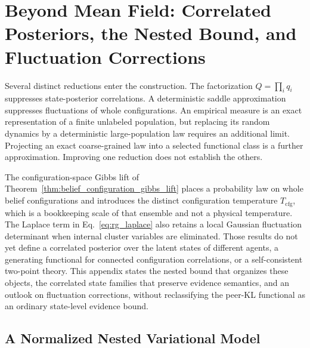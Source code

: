 \section{Beyond Mean Field: Correlated Posteriors, the Nested Bound, and Fluctuation Corrections}
\label{sec:beyond_mean_field_gauge_vfe}

Several distinct reductions enter the construction. The factorization $Q=\prod_i q_i$ suppresses state-posterior correlations. A deterministic saddle approximation suppresses fluctuations of whole configurations. An empirical measure is an exact representation of a finite unlabeled population, but replacing its random dynamics by a deterministic large-population law requires an additional limit. Projecting an exact coarse-grained law into a selected functional class is a further approximation. Improving one reduction does not establish the others.

The configuration-space Gibbs lift of Theorem~\ref{thm:belief_configuration_gibbs_lift} places a probability law on whole belief configurations and introduces the distinct configuration temperature $T_{\mathrm{cfg}}$, which is a bookkeeping scale of that ensemble and not a physical temperature. The Laplace term in Eq.~\eqref{eq:rg_laplace} also retains a local Gaussian fluctuation determinant when internal cluster variables are eliminated. Those results do not yet define a correlated posterior over the latent states of different agents, a generating functional for connected configuration correlations, or a self-consistent two-point theory. This appendix states the nested bound that organizes these objects, the correlated state families that preserve evidence semantics, and an outlook on fluctuation corrections, without reclassifying the peer-KL functional as an ordinary state-level evidence bound.

\subsection{A Normalized Nested Variational Model}

